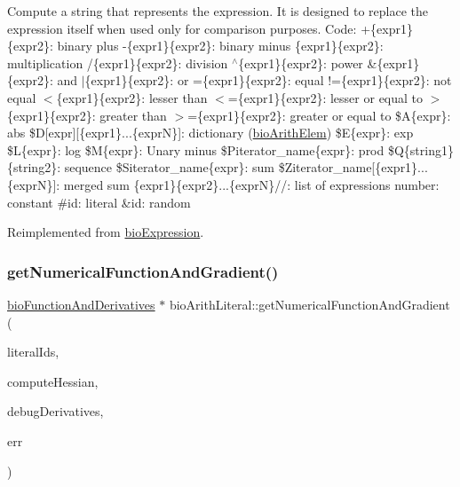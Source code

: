 Compute a string that represents the expression. It is designed to replace the expression itself when used only for comparison purposes. Code\+: +\{expr1\}\{expr2\}\+: binary plus -\/\{expr1\}\{expr2\}\+: binary minus \{expr1\}\{expr2\}\+: multiplication /\{expr1\}\{expr2\}\+: division $^\wedge$\{expr1\}\{expr2\}\+: power \&\{expr1\}\{expr2\}\+: and $\vert$\{expr1\}\{expr2\}\+: or =\{expr1\}\{expr2\}\+: equal !=\{expr1\}\{expr2\}\+: not equal $<$\{expr1\}\{expr2\}\+: lesser than $<$=\{expr1\}\{expr2\}\+: lesser or equal to $>$\{expr1\}\{expr2\}\+: greater than $>$=\{expr1\}\{expr2\}\+: greater or equal to \$A\{expr\}\+: abs \$D\mbox{[}expr\mbox{]}\mbox{[}\{expr1\}...\{exprN\}\mbox{]}\+: dictionary (\hyperlink{classbio_arith_elem}{bio\+Arith\+Elem}) \$E\{expr\}\+: exp \$L\{expr\}\+: log \$M\{expr\}\+: Unary minus \$\+Piterator\+\_\+name\{expr\}\+: prod \$Q\{string1\}\{string2\}\+: sequence \$\+Siterator\+\_\+name\{expr\}\+: sum \$\+Ziterator\+\_\+name\mbox{[}\{expr1\}...\{exprN\}\mbox{]}\+: merged sum \{expr1\}\{expr2\}...\{exprN\}//\+: list of expressions number\+: constant \#id\+: literal \&id\+: random 

Reimplemented from \hyperlink{classbio_expression_a3e4b4dca58dbbc6f0e411b30eb3f60b4}{bio\+Expression}.

\mbox{\label{classbio_arith_literal_acce01225d50f0ba0a263b2fbaa71b79b}} 
\subsubsection{\texorpdfstring{get\+Numerical\+Function\+And\+Gradient()}{getNumericalFunctionAndGradient()}}
{\footnotesize\ttfamily \hyperlink{classbio_function_and_derivatives}{bio\+Function\+And\+Derivatives} $\ast$ bio\+Arith\+Literal\+::get\+Numerical\+Function\+And\+Gradient (\begin{DoxyParamCaption}\item[{vector$<$ pat\+U\+Long $>$}]{literal\+Ids,  }\item[{pat\+Boolean}]{compute\+Hessian,  }\item[{pat\+Boolean}]{debug\+Derivatives,  }\item[{pat\+Error $\ast$\&}]{err }\end{DoxyParamCaption})\hspace{0.3cm}{\ttfamily [virtual]}}

